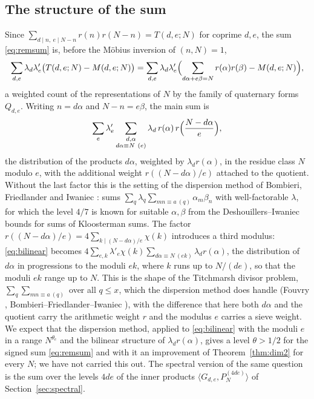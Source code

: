 ﻿\documentclass[11pt]{amsart}
\theoremstyle{remark}
\begin{document}
\subsection{The structure of the sum}
Since $\sum_{d\mid n,\ e\mid N-n}r(n)r(N-n)=T(d,e;N)$ for coprime $d,e$, the sum \eqref{eq:remsum} is, before the M\"obius inversion of $(n,N)=1$,
\[
\sum_{d,e}\lambda_d\lambda'_e\bigl(T(d,e;N)-M(d,e;N)\bigr)=\sum_{d,e}\lambda_d\lambda'_e\Bigl(\sum_{d\alpha+e\beta=N}r(\alpha)r(\beta)-M(d,e;N)\Bigr),
\]
a weighted count of the representations of $N$ by the family of quaternary forms $Q_{d,e}$. Writing $n=d\alpha$ and $N-n=e\beta$, the main sum is
\begin{equation}\label{eq:bilinear}
\sum_{e}\lambda'_e\sum_{\substack{d,\alpha\\ d\alpha\equiv N\ (e)}}\lambda_d\,r(\alpha)\,r\Bigl(\frac{N-d\alpha}e\Bigr),
\end{equation}
the distribution of the products $d\alpha$, weighted by $\lambda_dr(\alpha)$, in the residue class $N$ modulo $e$, with the additional weight $r((N-d\alpha)/e)$ attached to the quotient. Without the last factor this is the setting of the dispersion method of Bombieri, Friedlander and Iwaniec \cite{BFI}: sums $\sum_q\lambda_q\sum_{mn\equiv a\ (q)}\alpha_m\beta_n$ with well-factorable $\lambda$, for which the level $4/7$ is known for suitable $\alpha,\beta$ from the Deshouillers--Iwaniec bounds for sums of Kloosterman sums. The factor $r((N-d\alpha)/e)=4\sum_{k\mid(N-d\alpha)/e}\chi(k)$ introduces a third modulus: \eqref{eq:bilinear} becomes $4\sum_{e,k}\lambda'_e\chi(k)\sum_{d\alpha\equiv N\ (ek)}\lambda_dr(\alpha)$, the distribution of $d\alpha$ in progressions to the moduli $ek$, where $k$ runs up to $N/(de)$, so that the moduli $ek$ range up to $N$. This is the shape of the Titchmarsh divisor problem, $\sum_{q}\sum_{mn\equiv a\ (q)}$ over all $q\le x$, which the dispersion method does handle (Fouvry \cite{Fouvry}, Bombieri--Friedlander--Iwaniec \cite{BFI}), with the difference that here both $d\alpha$ and the quotient carry the arithmetic weight $r$ and the modulus $e$ carries a sieve weight. We expect that the dispersion method, applied to \eqref{eq:bilinear} with the moduli $e$ in a range $N^{\theta_e}$ and the bilinear structure of $\lambda_dr(\alpha)$, gives a level $\theta>1/2$ for the signed sum \eqref{eq:remsum} and with it an improvement of Theorem~\ref{thm:dim2} for every $N$; we have not carried this out. The spectral version of the same question is the sum over the levels $4de$ of the inner products $\langle G_{d,e},P_N^{(4de)}\rangle$ of Section~\ref{sec:spectral}.
\end{document}

